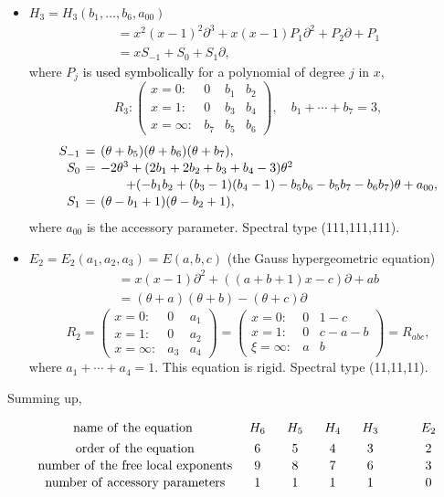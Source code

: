 \documentclass[a4paper,12pt]{article}
\theoremstyle{definition}
\theoremstyle{remark}
\newtheorem{remark}[thm]{Remark}
\numberwithin{equation}{section} %
\newcommand{\blue}[1]{\textcolor{black}{#1}}
\begin{document}
\begin{itemize}[leftmargin=*]
\item $H_3=H_3(b_1,\dots,b_6,a_{00})$
  $$\begin{array}{l}=x^2(x-1)^2\partial^3+x(x-1)P_1\partial^2+P_2\partial+P_1\\[2mm]
  =xS_{-1}+S_0+S_1\partial,\end{array}$$
where $P_j$ \blue{is used symbolically} for a polynomial of degree $j$ in $x$,
  \[R_3:\left(\begin{array}{llll}x=0:&0&b_1&b_2\\ x=1:&0&b_3&b_4\\ x=\infty:&b_7&b_5&b_6\end{array}\right),\quad b_1+\cdots+b_7=3,\]
\[\def\arraystretch{1.1}\setlength\arraycolsep{2pt} \begin{array}{rcl}
    S_{-1}&=&(\theta+b_5)(\theta+b_6)(\theta+b_7),\\
    S_0&=& -2\theta^3+(2b_1+2b_2+b_3+b_4-3)\theta^2 \\
    &&\qquad +(-b_1b_2+(b_3-1)(b_4-1)-b_5 b_6 - b_5 b_7 - b_6 b_7)\theta+a_{00},\\
    S_1&=&(\theta-b_1+1)(\theta-b_2+1),
  \end{array}
  \]
  where $a_{00}$ is the accessory parameter. Spectral type (111,111,111).
\item $E_2=E_2(a_1,a_2,a_3)=E(a,b,c)$ (the Gauss hypergeometric equation)
$$\begin{array}{l}
=x(x-1)\partial^2+((a+b+1)x-c)\partial +ab\\
=(\theta+a)(\theta+b)-(\theta+c)\partial   \end{array}$$   
  \[
     R_2=\left(\begin{array}{lll}x=0:&0&a_1\\
     x=1:&0&a_2\\
     x=\infty:&a_3&a_4\end{array}\right)=
         \left(\begin{array}{llc}x=0:&0&1-c\\
       x=1:&0&c-a-b\\
       \xi=\infty:&a&b\end{array}\right)= R_{abc},      
       \]
       where $a_1+\cdots+a_4=1.$ This equation is rigid. Spectral type (11,11,11).
\end{itemize}
Summing up,
 \par\medskip
\[\begin{array}{cccccc  }
{\rm name\ of\ the\ equation}  \ &\ H_6\ &\ H_5\ &\ H_4\ &\ H_3\ &\qquad E_2 \\[1mm]
{\rm order\ of\ the\ equation} &6  &5  &4  &3 &\qquad2\\
{\rm number\ of\ the\ free\ local\ exponents}&9&8 &7  &6 &\qquad3\\
{\rm number\ of\ accessory\ parameters} &\ 1\ &\ 1\  &\ 1\   &\ 1\  &\qquad 0
\end{array}
\]
\addtolength{\arraycolsep}{1pt}   %
\end{document}
